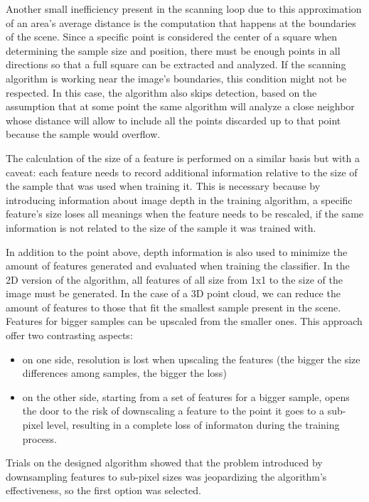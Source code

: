 \documentclass[a4paper,12pt,titlepage]{article}
\begin{document}
Another small inefficiency present in the scanning loop due to this
approximation of an area's average distance is the computation that happens at
the boundaries of the scene. Since a specific point is considered the center of
a square when determining the sample size and position, there must be enough
points in all directions so that a full square can be extracted and analyzed. If
the scanning algorithm is working near the image's boundaries, this condition
might not be respected. In this case, the algorithm also skips detection, based
on the assumption that at some point the same algorithm will analyze a close
neighbor whose distance will allow to include all the points discarded up to
that point because the sample would overflow.

The calculation of the size of a feature is performed on a similar basis but
with a caveat: each feature needs to record additional information relative to
the size of the sample that was used when training it. This is necessary because
by introducing information about image depth in the training algorithm, a
specific feature's size loses all meanings when the feature needs to be
rescaled, if the same information is not related to the size of the sample it
was trained with.

In addition to the point above, depth information is also used to minimize the
amount of features generated and evaluated when training the classifier. In the
2D version of the algorithm, all features of all size from 1x1 to the size of
the image must be generated. In the case of a 3D point cloud, we can reduce the
amount of features to those that fit the smallest sample present in the scene.
Features for bigger samples can be upscaled from the smaller ones. This approach
offer two contrasting aspects:

\begin{itemize}
  \item on one side, resolution is lost when upscaling the features (the bigger the
  size differences among samples, the bigger the loss)
  \item on the other side, starting from a set of features for a bigger sample, opens
  the door to the risk of downscaling a feature to the point it goes to a
  sub-pixel level, resulting in a complete loss of informaton during the training
  process.
\end{itemize}

Trials on the designed algorithm showed that the problem introduced by
downsampling features to sub-pixel sizes was jeopardizing the algorithm's
effectiveness, so the first option was selected.
\end{document}
